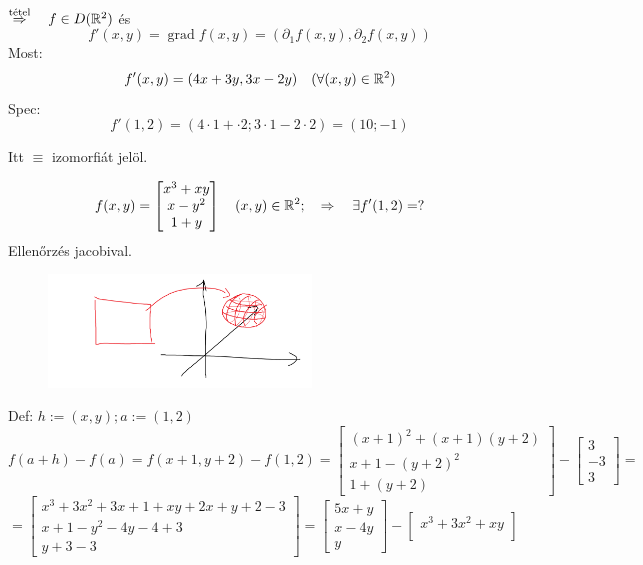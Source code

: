 \documentclass[a4paper,11.5pt]{article}
\DeclareMathOperator{\grad}{grad}
\begin{document}
\begin{task}
\begin{task}
\begin{revision}
				$\overset{\text{tétel}}{\Rightarrow}\quad f\in D(\mathbb{R}^2)$ és 
				\[ f'(x,y)=\grad f(x,y)=(\partial_1 f(x,y), \partial_2f(x,y)) \]
				Most:
				\[ f'(x,y)=(4x+3y,3x-2y)\quad (\forall(x,y)\in\mathbb{R}^2) \]
				Spec:
				\[ f'(1,2)=(4\cdot1+\cdot2;3\cdot1-2\cdot2)=(10;-1) \]
			\end{revision}
		\end{task}
		\begin{note}
			Itt $\equiv$ izomorfiát jelöl.
		\end{note}
		
		\begin{task}
			\[ f(x,y)=\begin{bmatrix}
				x^3+xy\\
				x-y^2\\
				1+y
			\end{bmatrix}\quad (x,y)\in\mathbb{R}^2;\quad \Rightarrow\quad \exists f'(1,2)=? \]
			Ellenőrzés jacobival.
			\begin{figure}[H]
				\centering
				\includegraphics[height=3cm]{kepek/05.png}
				\caption{}
			\end{figure}
			Def: $h:=(x,y); a:=(1,2)$
			\[ f(a+h)-f(a)=f(x+1,y+2)-f(1,2)=\begin{bmatrix}
				(x+1)^2+(x+1)(y+2)\\
				x+1-(y+2)^2\\
				1+(y+2)
			\end{bmatrix}-\begin{bmatrix}
				3\\
				-3\\
				3
			\end{bmatrix}=\]
			\[=\begin{bmatrix}
				x^3+3x^2+3x+1+xy+2x+y+2-3\\
				x+1-y^2-4y-4+3\\
				y+3-3
			\end{bmatrix}=\begin{bmatrix}
			5x+y\\
			x-4y\\
			y
			\end{bmatrix}-\begin{bmatrix}
				x^3+3x^2+xy\\

\end{bmatrix}\]
\end{task}
\end{task}
\end{document}
